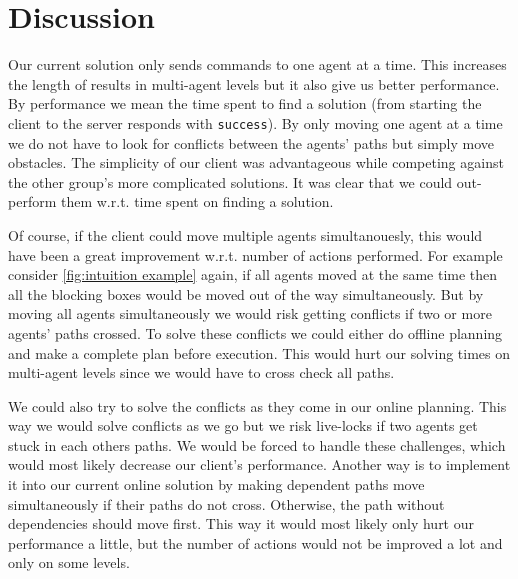 \section{Discussion}
\label{sec:discussion}
Our current solution only sends commands to one agent at a time.
This increases the length of results in multi-agent levels but it also give us better performance.
By performance we mean the time spent to find a solution (from starting the client to the server responds with \texttt{success}).
By only moving one agent at a time we do not have to look for conflicts between the agents' paths but simply move obstacles.
The simplicity of our client was advantageous while competing against the other group's more complicated solutions.
It was clear that we could out-perform them w.r.t. time spent on finding a solution.

Of course, if the client could move multiple agents simultanouesly, this would have been a great improvement w.r.t. number of actions performed.
For example consider \cref{fig:intuition example} again, if all agents moved at the same time then all the blocking boxes would be moved out of the way simultaneously.
But by moving all agents simultaneously we would risk getting conflicts if two or more agents' paths crossed.
To solve these conflicts we could either do offline planning and make a complete plan before execution.
This would hurt our solving times on multi-agent levels since we would have to cross check all paths.

We could also try to solve the conflicts as they come in our online planning.
This way we would solve conflicts as we go but we risk live-locks if two agents get stuck in each others paths.
We would be forced to handle these challenges, which would most likely decrease our client's performance.
Another way is to implement it into our current online solution by making dependent paths move simultaneously if their paths do not cross.
Otherwise, the path without dependencies should move first.
This way it would most likely only hurt our performance a little, but the number of actions would not be improved a lot and only on some levels.




